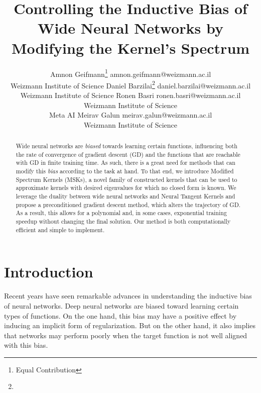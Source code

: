 \documentclass[10pt]{article} %
\title{Controlling the Inductive Bias of Wide Neural Networks by Modifying the Kernel’s Spectrum}
\author{\name Amnon Geifmann\footnote[1]{Equal Contribution} \email amnon.geifmann@weizmann.ac.il \\
      \addr Weizmann Institute of Science
      \AND
      \name Daniel Barzilai\footnote[1]{} \email daniel.barzilai@weizmann.ac.il \\
      \addr Weizmann Institute of Science
      \AND
      \name Ronen Basri \email ronen.basri@weizmann.ac.il \\
      \addr Weizmann Institute of Science \\ 
      Meta AI
      \AND
      \name Meirav Galun \email meirav.galun@weizmann.ac.il \\
      \addr Weizmann Institute of Science 
      }
\theoremstyle{plain}
\theoremstyle{definition}
\theoremstyle{remark}
\begin{document}
\maketitle
\renewcommand{\thefootnote}{\fnsymbol{footnote}}\renewcommand{\thefootnote}{\arabic{footnote}}\addtocounter{footnote}{-1}

\begin{abstract}
Wide neural networks are {\em biased} towards learning certain functions, influencing both the rate of convergence of gradient descent (GD) and the functions that are reachable with GD in finite training time. As such, there is a great need for methods that can modify this {\em bias} according to the task at hand. To that end, we introduce Modified Spectrum Kernels (MSKs), a novel family of constructed kernels that can be used to approximate kernels with desired eigenvalues for which no closed form is known. We leverage the duality between wide neural networks and Neural Tangent Kernels and propose a preconditioned gradient descent method, which alters the trajectory of GD. As a result, this allows for a polynomial and, in some cases, exponential training speedup without changing the final solution. Our method is both computationally efficient and simple to implement. 
\end{abstract}

\section{Introduction}

Recent years have seen remarkable advances in understanding the inductive bias of neural networks. Deep neural networks are biased toward learning certain types of functions. On the one hand, this bias may have a positive effect by inducing an implicit form of regularization. But on the other hand, it also implies that networks may perform poorly when the target function is not well aligned with this bias. 
\end{document}
